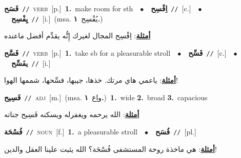 \documentclass[10pt,a4paper,twoside]{article} %
\begin{document}
\begin{multicols}{2}
{\setlength\topsep{0pt}\textbf{\foreignlanguage{arabic}{فَسَح}}\ {\color{gray}\texttt{//}\color{black}}\ \textsc{verb}\ [p.]\ \textbf{1.}~make room for sth\ \ $\bullet$\ \ \setlength\topsep{0pt}\textbf{\foreignlanguage{arabic}{اِفْسِح}}\ {\color{gray}\texttt{//}\color{black}}\ [c.]\ \ $\bullet$\ \ \setlength\topsep{0pt}\textbf{\foreignlanguage{arabic}{يِفْسِح}}\ {\color{gray}\texttt{//}\color{black}}\ [i.]\ \color{gray}(msa. \foreignlanguage{arabic}{يُفْسِح}~\foreignlanguage{arabic}{\textbf{١.}})\color{black}\  \begin{flushright}\color{gray}\foreignlanguage{arabic}{\textbf{\underline{\foreignlanguage{arabic}{أمثلة}}}: اِفْسِح المجال لغيرك إِنُّه يقدِّم أفضل ماعنده}\end{flushright}\color{black}} \vspace{2mm}

{\setlength\topsep{0pt}\textbf{\foreignlanguage{arabic}{فَسَّح}}\ {\color{gray}\texttt{//}\color{black}}\ \textsc{verb}\ [p.]\ \textbf{1.}~take sb for a pleasurable stroll\ \ $\bullet$\ \ \setlength\topsep{0pt}\textbf{\foreignlanguage{arabic}{فَسِّح}}\ {\color{gray}\texttt{//}\color{black}}\ [c.]\ \ $\bullet$\ \ \setlength\topsep{0pt}\textbf{\foreignlanguage{arabic}{يفَسِّح}}\ {\color{gray}\texttt{//}\color{black}}\ [i.]\  \begin{flushright}\color{gray}\foreignlanguage{arabic}{\textbf{\underline{\foreignlanguage{arabic}{أمثلة}}}: ياعمي هاي مرتك. خذها، جيبها، فسِّحها، شممها الهوا!}\end{flushright}\color{black}} \vspace{2mm}

{\setlength\topsep{0pt}\textbf{\foreignlanguage{arabic}{فَسِيح}}\ {\color{gray}\texttt{//}\color{black}}\ \textsc{adj}\ [m.]\ \color{gray}(msa. \foreignlanguage{arabic}{واِع}~\foreignlanguage{arabic}{\textbf{١.}})\color{black}\ \textbf{1.}~wide  \textbf{2.}~broad  \textbf{3.}~capacious\  \begin{flushright}\color{gray}\foreignlanguage{arabic}{\textbf{\underline{\foreignlanguage{arabic}{أمثلة}}}: الله يرحمه ويغفرله ويسكنه فَسِيح جناته}\end{flushright}\color{black}} \vspace{2mm}

{\setlength\topsep{0pt}\textbf{\foreignlanguage{arabic}{فُسْحَة}}\ {\color{gray}\texttt{//}\color{black}}\ \textsc{noun}\ [f.]\ \textbf{1.}~a pleasurable stroll\ \ $\bullet$\ \ \setlength\topsep{0pt}\textbf{\foreignlanguage{arabic}{فُسَح}}\ {\color{gray}\texttt{//}\color{black}}\ [pl.]\  \begin{flushright}\color{gray}\foreignlanguage{arabic}{\textbf{\underline{\foreignlanguage{arabic}{أمثلة}}}: هي ماخذة روحة المستشفى فُسْحَة؟ الله يثبت علينا العقل والدين!}\end{flushright}\color{black}} \vspace{2mm}


\end{multicols}
\end{document}
